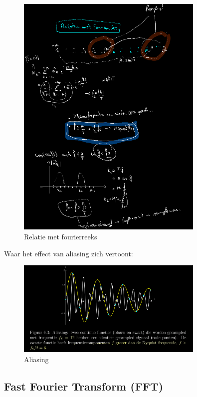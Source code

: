 \documentclass[a4paper]{report}
\begin{document}
\begin{figure}[H]
	\centering
	\includegraphics[width=0.8\textwidth]{assets/relatie_met_fourierreeks.png}
	\caption{Relatie met fourierreeks}
	\label{fig:relatie_met_fourierreeks}
\end{figure}

Waar het effect van aliasing zich vertoont:

\begin{figure}[H]
	\centering
	\includegraphics[width=0.8\textwidth]{assets/aliasing.png}
	\caption{Aliasing}
	\label{fig:aliasing}
\end{figure}

\subsection{Fast Fourier Transform (FFT)}
\end{document}
